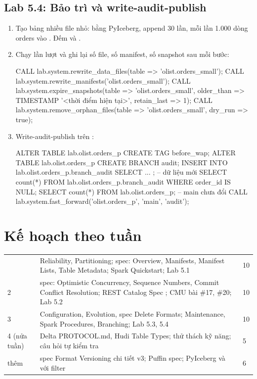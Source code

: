 \subsection{Lab 5.4: Bảo trì và write-audit-publish}
\begin{enumerate}
  \item Tạo bảng nhiều file nhỏ: bằng PyIceberg, append 30 lần, mỗi lần 1.000 dòng orders vào . Đếm  và .
  \item Chạy lần lượt và ghi lại số file, số manifest, số snapshot sau mỗi bước:
\begin{codeblock}
CALL lab.system.rewrite_data_files(table => 'olist.orders_small');
CALL lab.system.rewrite_manifests('olist.orders_small');
CALL lab.system.expire_snapshots(table => 'olist.orders_small',
     older_than => TIMESTAMP '<thời điểm hiện tại>', retain_last => 1);
CALL lab.system.remove_orphan_files(table => 'olist.orders_small', dry_run => true);
\end{codeblock}
  \item Write-audit-publish trên :
\begin{codeblock}
ALTER TABLE lab.olist.orders_p CREATE TAG before_wap;
ALTER TABLE lab.olist.orders_p CREATE BRANCH audit;
INSERT INTO lab.olist.orders_p.branch_audit SELECT ... ;   -- dữ liệu mới
SELECT count(*) FROM lab.olist.orders_p.branch_audit WHERE order_id IS NULL;
SELECT count(*) FROM lab.olist.orders_p;                    -- main chưa đổi
CALL lab.system.fast_forward('olist.orders_p', 'main', 'audit');
\end{codeblock}
\end{enumerate}

\section{Kế hoạch theo tuần}
\begin{xltabular}{\textwidth}{@{}P{1.4cm} L P{1.4cm}@{}}
\toprule
{} &  &  \\
\midrule
\endhead
\bottomrule
{} & Reliability, Partitioning; spec: Overview, Manifests, Manifest Lists, Table Metadata; Spark Quickstart; Lab 5.1 & 10 \\
2 & spec: Optimistic Concurrency, Sequence Numbers, Commit Conflict Resolution; REST Catalog Spec ; CMU bài \#17, \#20; Lab 5.2 & 10 \\
3 & Configuration, Evolution, spec Delete Formats; Maintenance, Spark Procedures, Branching; Lab 5.3, 5.4 & 10 \\
4 (nửa tuần) & Delta PROTOCOL.md, Hudi Table Types; thử thách kỹ năng; câu hỏi tự kiểm tra & 5 \\
thêm & spec Format Versioning chi tiết v3; Puffin spec; PyIceberg  và  với filter & 6 \\
\end{xltabular}

